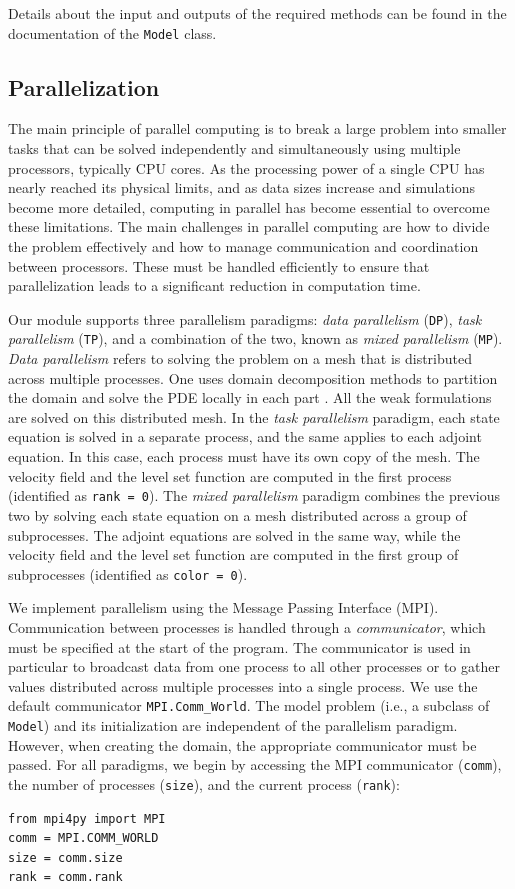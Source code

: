 \documentclass[preprint,9pt]{elsarticle}
\begin{document}
Details about the input and outputs of the required methods
can be found in the documentation of the \texttt{Model} class.

\subsection{Parallelization}\label{sub:parallel}

The main principle of parallel computing is to break a large problem
into smaller tasks that can be solved independently and simultaneously
using multiple processors, typically CPU cores.
As the processing power of a single CPU has nearly reached its physical limits,
and as data sizes increase and simulations become more detailed,
computing in parallel has become essential to overcome these limitations.
The main challenges in parallel computing are how to divide
the problem effectively and how to manage communication
and coordination between processors.
These must be handled efficiently to ensure that parallelization
leads to a significant reduction in computation time.

Our module supports three parallelism paradigms:
\textit{data parallelism} (\texttt{DP}),
\textit{task parallelism} (\texttt{TP}), and a combination of the two,
known as \textit{mixed parallelism} (\texttt{MP}).
\textit{Data parallelism} refers to solving the problem on a mesh
that is distributed across multiple processes.
One uses domain decomposition methods to partition the domain
and solve the PDE locally in each part \cite{MR2104179}. 
All the weak formulations are solved on this distributed mesh.
In the \textit{task parallelism} paradigm, each state equation is solved
in a separate process, and the same applies to each adjoint equation.
In this case, each process must have its own copy of the mesh.
The velocity field and the level set function are computed
in the first process (identified as \texttt{rank = 0}).
The \textit{mixed parallelism} paradigm combines the previous two by
solving each state equation on a mesh distributed across a group
of subprocesses. The adjoint equations are solved in the same 
way, while the velocity field and the level set function are computed
in the first group of subprocesses (identified as \texttt{color = 0}).

We implement parallelism using the Message Passing Interface (MPI). 
Communication between processes is handled through a {\it communicator},
which must be specified at the start of the program.
The communicator is used in particular to broadcast data
from one process to all other processes or to gather values distributed
across multiple processes into a single process.
We use the default communicator \texttt{MPI.Comm\_World}.
The model problem (i.e., a subclass of \texttt{Model})
and its initialization are independent of the parallelism paradigm.
However, when creating the domain, the appropriate communicator must be passed.
For all paradigms, we begin by accessing the MPI communicator (\texttt{comm}),
the number of processes (\texttt{size}),
and the current process (\texttt{rank}):
\begin{lstlisting}
from mpi4py import MPI
comm = MPI.COMM_WORLD
size = comm.size
rank = comm.rank
\end{lstlisting}
\end{document}
